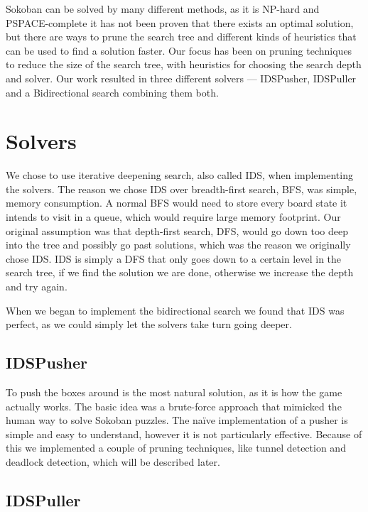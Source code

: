\documentclass[a4paper,11pt]{article}
\renewcommand{\*}[0]{\cdot}
\begin{document}

Sokoban can be solved by many different methods, as it is NP-hard and
PSPACE-complete it has not been proven that there exists an optimal solution,
but there are ways to prune the search tree and different kinds of heuristics
that can be used to find a solution faster. Our focus has been on pruning
techniques to reduce the size of the search tree, with heuristics for choosing
the search depth and solver. Our work resulted in three different solvers ---
IDSPusher, IDSPuller and a Bidirectional search combining them both.


\section{Solvers}

We chose to use iterative deepening search, also called IDS, when
implementing the solvers. The reason we chose IDS over breadth-first search,
BFS, was simple, memory consumption. A normal BFS would need to store every
board state it intends to visit in a queue, which would require large memory
footprint. Our original assumption was that depth-first search, DFS, would go
down too deep into the tree and possibly go past solutions, which was the
reason we originally chose IDS. IDS is simply a DFS that only goes down to a
certain level in the search tree, if we find the solution we are done, otherwise we
increase the depth and try again.

When we began to implement the bidirectional search we found that IDS was
perfect, as we could simply let the solvers take turn going deeper.

\subsection{IDSPusher}

To push the boxes around is the most natural solution, as it is how the game
actually works. The basic idea was a brute-force approach that mimicked the
human way to solve Sokoban puzzles. The naïve implementation of a pusher is
simple and easy to understand, however it is not particularly effective.
Because of this we implemented a couple of pruning techniques, like tunnel
detection and deadlock detection, which will be described later.

\subsection{IDSPuller}
\end{document}
